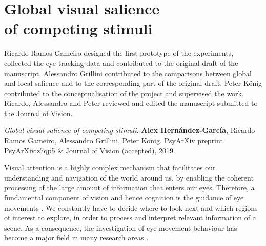 {
\chapter[Global visual salience of competing stimuli]{Global visual salience\\of competing stimuli}
\label{ch:globsal}
\renewcommand{\chapterpath}{includes/global-salience}
%
\begin{contributors}
    Ricardo Ramos Gameiro designed the first prototype of the experiments, collected the eye tracking data and contributed to the original draft of the manuscript. Alessandro Grillini contributed to the comparisons between global and local salience and to the corresponding part of the original draft. Peter K{\"o}nig contributed to the conceptualisation of the project and supervised the work. Ricardo, Alessandro and Peter reviewed and edited the manuscript submitted to the Journal of Vision.
\end{contributors}
%
\begin{outreach}
    \item \textit{Global visual salience of competing stimuli.} \textbf{Alex Hern{\'a}ndez-Garc{\'i}a}, Ricardo Ramos Gameiro, Alessandro Grillini, Peter K{\"o}nig. PsyArXiv preprint PsyArXiv:z7qp5 \& Journal of Vision (accepted), 2019.
\end{outreach}
%
Visual attention is a highly complex mechanism that facilitates our understanding and navigation of the world around us, by enabling the coherent processing of the large amount of information that enters our eyes. Therefore, a fundamental component of vision and hence cognition is the guidance of eye movements \citep{liversedge2000eyemovements, geisler2011eyemovements, konig2016eyemovements}. We constantly have to decide where to look next and which regions of interest to explore, in order to process and interpret relevant information of a scene. As a consequence, the investigation of eye movement behaviour has become a major field in many research areas \citep{kowler2011eyemovements, kaspar2013visualattention}. 

}
